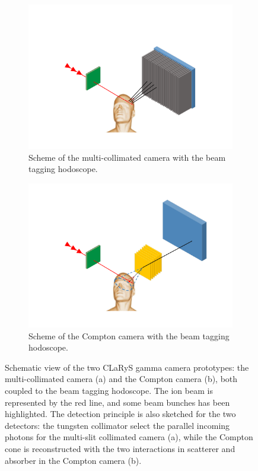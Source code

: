 \begin{figure}
\begin{subfigure}[b]{.5\textwidth}
\centering
\includegraphics[width=1.2\textwidth]{03_GraphicFiles/chapter3_CLaRySproto/schemes/schema_Collimated_withHodo.pdf}
\caption{Scheme of the multi-collimated camera with the beam tagging hodoscope.}
\label{chap3::subfig::multiCollScheme}
\end{subfigure}
\begin{subfigure}[b]{.5\textwidth}
\centering
\includegraphics[width=1.2\textwidth]{03_GraphicFiles/chapter3_CLaRySproto/schemes/schema_Compton_withHodo.pdf}	
\caption{Scheme of the Compton camera with the beam tagging hodoscope.}
\label{chap3::subfig::ComptonScheme}
\end{subfigure}
\caption{Schematic view of the two CLaRyS gamma camera prototypes: the multi-collimated camera (a) and the Compton camera (b), both coupled to the beam tagging hodoscope. The ion beam is represented by the red line, and some beam bunches has been highlighted. The detection principle is also sketched for the two detectors: the tungsten collimator select the parallel incoming photons for the multi-slit collimated camera (a), while the Compton cone is reconstructed with the two interactions in scatterer and absorber in the Compton camera (b).}
\label{chap3::fig::camerasScheme}
\end{figure}
 

